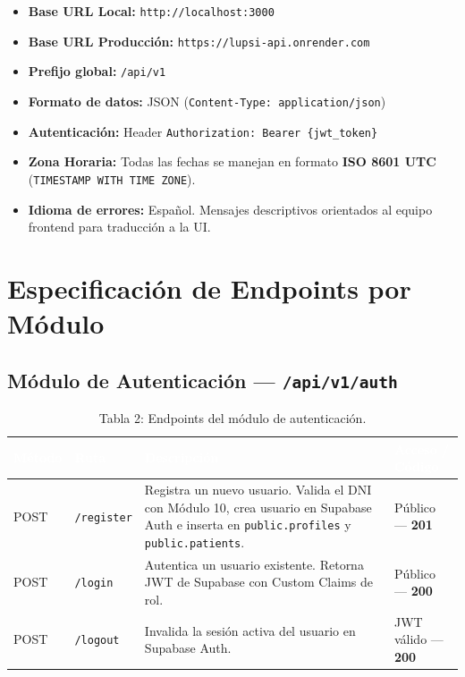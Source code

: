 \documentclass[a4paper,12pt]{article}
\renewcommand{\arraystretch}{1.1}
\begin{document}
\begin{itemize}
\item \textbf{Base URL Local:} \texttt{http://localhost:3000}
\item \textbf{Base URL Producción:} \texttt{https://lupsi-api.onrender.com}
\item \textbf{Prefijo global:} \texttt{/api/v1}
\item \textbf{Formato de datos:} JSON (\texttt{Content-Type: application/json})
\item \textbf{Autenticación:} Header \texttt{Authorization: Bearer \{jwt\_token\}}
\item \textbf{Zona Horaria:} Todas las fechas se manejan en formato \textbf{ISO 8601 UTC} (\texttt{TIMESTAMP WITH TIME ZONE}).
\item \textbf{Idioma de errores:} Español. Mensajes descriptivos orientados al equipo frontend para traducción a la UI.
\end{itemize}

\section{Especificación de Endpoints por Módulo}

\subsection{Módulo de Autenticación — \texttt{/api/v1/auth}}

\begin{table}[H]
\centering
\small
\renewcommand{\arraystretch}{1.6}
\begin{tabular}{|p{1.6cm}|p{2.4cm}|p{5.8cm}|p{3.4cm}|}
\hline
\rowcolor{SKTPrimary}
\textcolor{white}{\textbf{Método}} &
\textcolor{white}{\textbf{Ruta}} &
\textcolor{white}{\textbf{Descripción}} &
\textcolor{white}{\textbf{Acceso / Código}} \\
\hline
\rowcolor{rowPOST}
POST & \texttt{/register} & Registra un nuevo usuario. Valida el DNI con Módulo 10, crea usuario en Supabase Auth e inserta en \texttt{public.profiles} y \texttt{public.patients}. & Público — \textbf{201} \\
\hline
\rowcolor{rowPOST}
POST & \texttt{/login} & Autentica un usuario existente. Retorna JWT de Supabase con Custom Claims de rol. & Público — \textbf{200} \\
\hline
\rowcolor{rowPOST}
POST & \texttt{/logout} & Invalida la sesión activa del usuario en Supabase Auth. & JWT válido — \textbf{200} \\
\hline
\end{tabular}
\caption*{Tabla 2: Endpoints del módulo de autenticación.}
\end{table}
\end{document}
